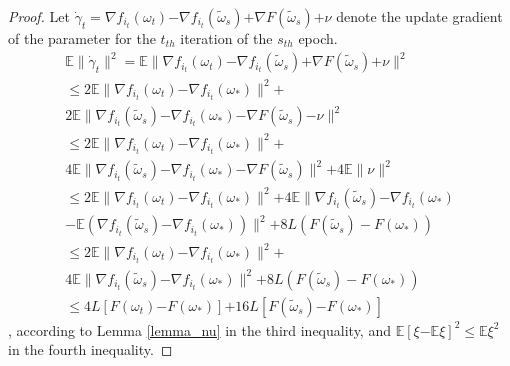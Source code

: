 \documentclass[letterpaper]{article}
\begin{document}
\begin{proof}
Let $\dot{\gamma}_t=\nabla f_{i_{t}}(\omega_{t}) \mathrm{-} \nabla f_{i_{t}}(\tilde{\omega}_s)  \mathrm{+} \nabla F(\tilde{\omega}_s)\mathrm{+}\nu$ denote the update gradient of the parameter for the $t_{th}$ iteration  of the $s_{th}$ epoch. 
\begin{equation}
\begin{array}{ll}
\mathbb{E}\parallel  \dot{\gamma}_{t} \parallel^2  
= \mathbb{E} \parallel \nabla f_{i_{t}}(\omega_{t}) \mathrm{-} \nabla f_{i_{t}}(\tilde{\omega}_s)  \mathrm{+} \nabla F(\tilde{\omega}_s) \mathrm{+} \nu \parallel^2\\
\le 2\mathbb{E} \parallel \nabla f_{i_{t}}(\omega_{t}) \mathrm{-} \nabla f_{i_{t}}(\omega_{\ast}) \parallel^2 \mathrm{+}\\
 2 \mathbb{E} \parallel  \nabla f_{i_{t}}(\tilde{\omega}_{s}) \mathrm{-} \nabla f_{i_{t}}(\omega_{\ast}) \mathrm{-} \nabla F(\tilde{\omega}_s)   \mathrm{-} \nu  \parallel^2  \\
\le 2\mathbb{E} \parallel \nabla f_{i_{t}}(\omega_{t}) \mathrm{-} \nabla f_{i_{t}}(\omega_{\ast}) \parallel^2  \mathrm{+} \\
4 \mathbb{E} \parallel  \nabla f_{i_{t}}(\tilde{\omega}_{s}) \mathrm{-} \nabla f_{i_{t}}(\omega_{\ast}) \mathrm{-} \nabla F(\tilde{\omega}_s) \parallel^2 \mathrm{+} 4\mathbb{E} \parallel \nu  \parallel^2 \\ 
\le 2\mathbb{E} \parallel \nabla f_{i_{t}}(\omega_{t}) \mathrm{-} \nabla f_{i_{t}}(\omega_{\ast}) \parallel^2  \mathrm{+} 4 \mathbb{E} \parallel  \nabla f_{i_{t}}(\tilde{\omega}_{s}) \mathrm{-} \nabla f_{i_{t}}(\omega_{\ast}) \\
\mathrm{-} \mathbb{E}\left ( \nabla f_{i_t}(\tilde{\omega}_s) \mathrm{-} \nabla f_{i_t}(\omega_\ast)   \right)\parallel^2   \mathrm{+} 8L ( F(\tilde{\omega}_s) - F(\omega_\ast))    \\ 
\le 2\mathbb{E} \parallel \nabla f_{i_{t}}(\omega_{t}) \mathrm{-} \nabla f_{i_{t}}(\omega_{\ast}) \parallel^2  \mathrm{+} \\
4 \mathbb{E} \parallel  \nabla f_{i_{t}}(\tilde{\omega}_{s}) \mathrm{-} \nabla f_{i_{t}}(\omega_{\ast}) \parallel^2 \mathrm{+} 8L ( F(\tilde{\omega}_s) - F(\omega_\ast))\\
\le 4L [F(\omega_t)\mathrm{-}F(\omega_\ast)] \mathrm{+} 16 L [F(\tilde{\omega}_s)\mathrm{-}F(\omega_\ast)]
\end{array} 
\end{equation}, according to Lemma \ref{lemma_nu} in the third inequality, and $\mathbb{E}[\xi\mathrm{-}\mathbb{E}\xi]^2 \le \mathbb{E}\xi^2$  in the fourth inequality.

\end{proof}
\end{document}
